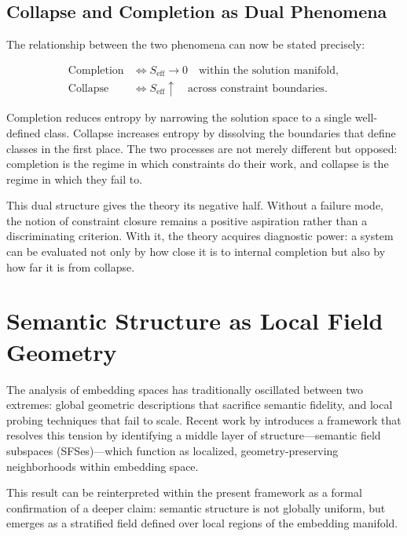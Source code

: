 \documentclass[11pt, twoside]{article}
\theoremstyle{plain}
\theoremstyle{definition}
\theoremstyle{remark}
\newcommand{\Seff}{S_{\text{eff}}}
\begin{document}
\subsection{Collapse and Completion as Dual Phenomena}

The relationship between the two phenomena can now be stated precisely:

\begin{align*}
\text{Completion} &\iff \Seff \to 0 \quad \text{within the solution manifold}, \\
\text{Collapse} &\iff \Seff \uparrow \quad \text{across constraint boundaries}.
\end{align*}

Completion reduces entropy by narrowing the solution space to a single well-defined class. Collapse increases entropy by dissolving the boundaries that define classes in the first place. The two processes are not merely different but opposed: completion is the regime in which constraints do their work, and collapse is the regime in which they fail to.

This dual structure gives the theory its negative half. Without a failure mode, the notion of constraint closure remains a positive aspiration rather than a discriminating criterion. With it, the theory acquires diagnostic power: a system can be evaluated not only by how close it is to internal completion but also by how far it is from collapse.

\section{Semantic Structure as Local Field Geometry}
\label{sec:semantic_fields}

The analysis of embedding spaces has traditionally oscillated between two extremes: global geometric descriptions that sacrifice semantic fidelity, and local probing techniques that fail to scale. Recent work by \cite{sun2025swallow} introduces a framework that resolves this tension by identifying a middle layer of structure---semantic field subspaces (SFSes)---which function as localized, geometry-preserving neighborhoods within embedding space.

This result can be reinterpreted within the present framework as a formal confirmation of a deeper claim: semantic structure is not globally uniform, but emerges as a stratified field defined over local regions of the embedding manifold.
\end{document}
